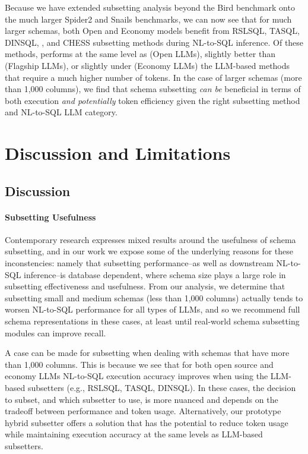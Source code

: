Because we have extended subsetting analysis beyond the Bird benchmark onto the much larger Spider2 and Snails benchmarks, we can now see that for much larger schemas, both Open and Economy models benefit from RSLSQL, TASQL, DINSQL, \PROJECTNAME, and CHESS subsetting methods during NL-to-SQL inference.
Of these methods, \PROJECTNAME{ }performs at the same level as (Open LLMs), slightly better than (Flagship LLMs), or slightly under (Economy LLMs) the LLM-based methods that require a much higher number of tokens.
In the case of larger schemas (more than 1,000 columns), we find that schema subsetting \emph{can be} beneficial in terms of both execution \emph{and potentially} token efficiency given the right subsetting method and NL-to-SQL LLM category.




\section{Discussion and Limitations}


\subsection{Discussion}

\paragraph{\textbf{Subsetting Usefulness}}
Contemporary research expresses mixed results around the usefulness of schema subsetting, and in our work we expose some of the underlying reasons for these inconstencies: namely that subsetting performance--as well as downstream NL-to-SQL inference--is database dependent, where schema size plays a large role in subsetting effectiveness and usefulness.
From our analysis, we determine that subsetting small and medium schemas (less than 1,000 columns) actually tends to worsen NL-to-SQL performance for all types of LLMs, and so we recommend full schema representations in these cases, at least until real-world schema subsetting modules can improve recall.

A case can be made for subsetting when dealing with schemas that have more than 1,000 columns. 
This is because we see that for both open source and economy LLMs NL-to-SQL execution accuracy improves when using the LLM-based subsetters (e.g., RSLSQL, TASQL, DINSQL).
In these cases, the decision to subset, and which subsetter to use, is more nuanced and depends on the tradeoff between performance and token usage.
Alternatively, our prototype \PROJECTNAME{ }hybrid subsetter offers a solution that has the potential to reduce token usage while maintaining execution accuracy at the same levels as LLM-based subsetters.

